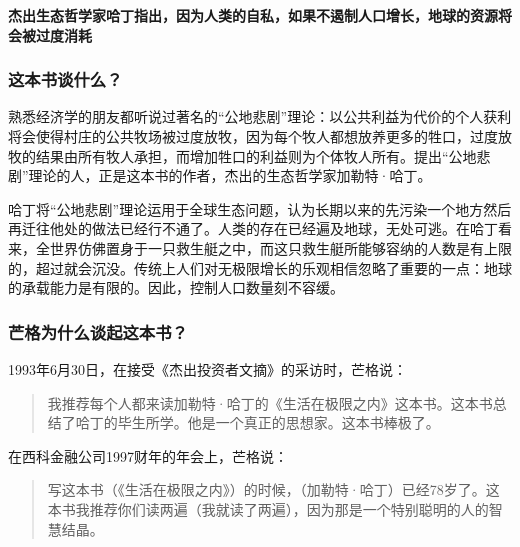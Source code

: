 \cleardoublepage
{}


\begin{BookSummaryBox}
\textbf{杰出生态哲学家哈丁指出，因为人类的自私，如果不遏制人口增长，地球的资源将会被过度消耗}
\par
\end{BookSummaryBox}

\subsubsection*{这本书谈什么？}

熟悉经济学的朋友都听说过著名的“公地悲剧”理论：以公共利益为代价的个人获利将会使得村庄的公共牧场被过度放牧，因为每个牧人都想放养更多的牲口，过度放牧的结果由所有牧人承担，而增加牲口的利益则为个体牧人所有。提出“公地悲剧”理论的人，正是这本书的作者，杰出的生态哲学家加勒特·哈丁。
\par

哈丁将“公地悲剧”理论运用于全球生态问题，认为长期以来的先污染一个地方然后再迁往他处的做法已经行不通了。人类的存在已经遍及地球，无处可逃。在哈丁看来，全世界仿佛置身于一只救生艇之中，而这只救生艇所能够容纳的人数是有上限的，超过就会沉没。传统上人们对无极限增长的乐观相信忽略了重要的一点：地球的承载能力是有限的。因此，控制人口数量刻不容缓。
\par

\subsubsection*{芒格为什么谈起这本书？}

1993年6月30日，在接受《杰出投资者文摘》的采访时，芒格说：
\par

\begin{quotation}
我推荐每个人都来读加勒特·哈丁的《生活在极限之内》这本书。这本书总结了哈丁的毕生所学。他是一个真正的思想家。这本书棒极了。
\par
\end{quotation}

在西科金融公司1997财年的年会上，芒格说：
\par

\begin{quotation}
写这本书（《生活在极限之内》）的时候，（加勒特·哈丁）已经78岁了。这本书我推荐你们读两遍（我就读了两遍），因为那是一个特别聪明的人的智慧结晶。
\par
\end{quotation}

